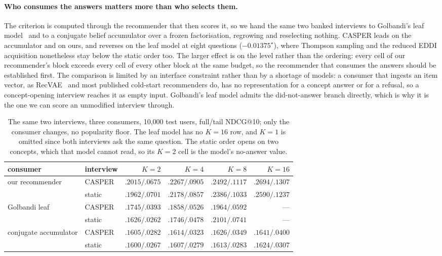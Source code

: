 \documentclass[runningheads]{llncs}
\begin{document}
\paragraph{Who consumes the answers matters more than who selects them.}
The criterion is computed through the recommender that then scores it, so we hand the same two banked
interviews to Golbandi's leaf model~\cite{golbandi2011adaptive} and to a conjugate belief accumulator
over a frozen factorisation, regrowing and reselecting nothing. CASPER leads on the accumulator and
on ours, and reverses on the leaf model at eight questions ($-0.01375^\star$), where Thompson sampling
and the reduced EDDI acquisition nonetheless stay below the static order too. The larger effect is
on the level rather than the ordering: every cell of our recommender's block exceeds every cell of
every other block at the same budget, so the recommender that consumes the answers should be
established first. The comparison is limited by an interface constraint rather than by a shortage of
models: a consumer that ingests an item vector, as RecVAE~\cite{ren2020recvae} and most published
cold-start recommenders do, has no representation for a concept answer or for a refusal, so a
concept-opening interview reaches it as empty input. Golbandi's leaf model admits the did-not-answer
branch directly, which is why it is the one we can score an unmodified interview through.

\begin{table}[tbp]
\centering
\caption{The same two interviews, three consumers, 10{,}000 test users, full/tail NDCG@10; only the
consumer changes, no popularity floor. The leaf model has no $K{=}16$ row, and $K{=}1$ is omitted
since both interviews ask the same question. The static order opens on two concepts, which that model
cannot read, so its $K{=}2$ cell is the model's no-answer value.}
\label{tab:consumers}
\footnotesize
\setlength{\tabcolsep}{3pt}
\begin{tabular}{@{}ll rrrr@{}}
\toprule
consumer & interview & $K{=}2$ & $K{=}4$ & $K{=}8$ & $K{=}16$ \\
\midrule
our recommender & CASPER & $.2015/.0675$ & $.2267/.0905$ & $.2492/.1117$ & $.2694/.1307$ \\
 & static & $.1962/.0701$ & $.2178/.0857$ & $.2386/.1033$ & $.2590/.1237$ \\
\midrule
Golbandi leaf & CASPER & $.1745/.0393$ & $.1858/.0526$ & $.1964/.0592$ & --- \\
 & static & $.1626/.0262$ & $.1746/.0478$ & $.2101/.0741$ & --- \\
\midrule
conjugate accumulator & CASPER & $.1605/.0282$ & $.1614/.0323$ & $.1626/.0349$ & $.1641/.0400$ \\
 & static & $.1600/.0267$ & $.1607/.0279$ & $.1613/.0283$ & $.1624/.0307$ \\
\bottomrule
\end{tabular}
\end{table}
\end{document}
